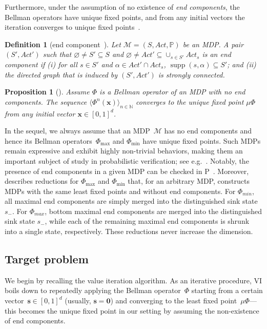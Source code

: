 \documentclass[preprint,12pt]{elsarticle}
\theoremstyle{plain}
\newtheorem{proposition}[theorem]{Proposition}
\newtheorem{definition}[theorem]{Definition}
\theoremstyle{definition}
\theoremstyle{remark}
\theoremstyle{claimstyle}
\newcommand{\mdp}{\mathcal{M}}
\newcommand{\prob}{\mathbb{P}}
\newcommand{\NN}{\mathbb{N}}
\DeclareMathOperator*{\supp}{supp}
\begin{document}
Furthermore, under the assumption of no existence of \emph{end components}, the Bellman operators have unique fixed points, and from any initial vectors the iteration converges to unique fixed points~\cite{HaddadM18}. 
\begin{definition}[end component~\cite{Alfaro97}]
	Let $\mdp = (S, Act, \prob)$ be an MDP. 
	A pair $(S', Act')$ such that $\varnothing \not =S' \subseteq S$ and $ \varnothing \not = Act'\subseteq \cup_{s\in S'}Act_s $ is an \emph{end component}
	if (i) for all $s\in S'$ and $\alpha \in Act'\cap Act_s$, $\supp(s, \alpha) \subseteq S'$; and (ii) the directed graph that is induced by $(S', Act')$ is strongly connected.  
\end{definition}
\begin{proposition}[\cite{HaddadM18}]\label{all-converge}
	Assume $\Phi$ is a Bellman operator of an MDP with no end components. 
	The sequence $\langle\Phi^n(\bm{x})\rangle_{n\in \NN}$ converges to the unique fixed point $\mu \Phi$ from any initial vector $\bm{x}\in [0, 1]^d$. 
\end{proposition}
In the sequel, we always assume that an MDP~$\mdp$ has no end components and hence its Bellman operators~$\Phi_{\max}$ and $\Phi_{\min}$ have unique fixed points.
Such MDPs remain expressive and exhibit highly non-trivial behaviors, making them an important subject of study in probabilistic verification; see e.g.~\cite{HaddadM18,BrazdilCCFKKPU14,QuatmannK18,hartmanns2020optimistic,Baier0L0W17}.
Notably, the presence of end components in a given MDP can be checked in P~\cite{Alfaro97}.
Moreover, \cite{HaddadM18}
describes reductions for $\Phi_{\max}$ and $\Phi_{\min}$ that, for an arbitrary MDP, constructs MDPs with the same least fixed points and without end components.
For $\Phi_{min}$, all maximal end components are simply merged into the distinguished sink state $s_{-}$. 
For $\Phi_{max}$, bottom maximal end components are merged into the distinguished sink state 
$s_{-}$, while each of the remaining maximal end components is shrunk into a single state, respectively.
These reductions never increase the dimension.
\subsection{Target problem}
We begin by recalling the value iteration algorithm.
As an iterative procedure, VI boils down to repeatedly applying the Bellman operator~$\Phi$ starting from a certain vector~$\bm{s} \in [0,1]^d$ (usually, $\bm{s} = \bm{0}$) 
and converging to the least fixed point~$\mu\Phi$---this becomes the unique fixed point in our setting by assuming the non-existence of end components.
\end{document}
